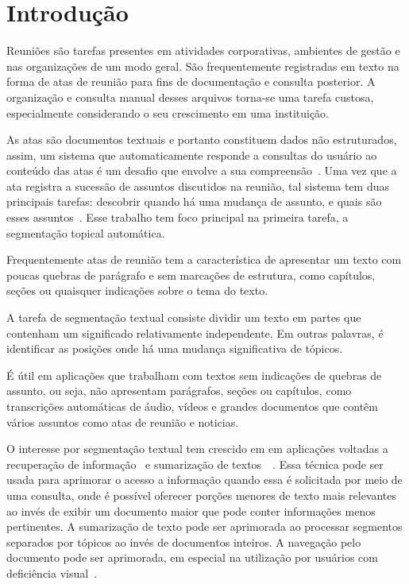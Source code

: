 

\section{Introdução}
	\label{sec:introducao}

Reuniões são tarefas presentes em atividades corporativas, ambientes de gestão e nas organizações de um modo geral. São frequentemente registradas em texto na forma de atas de reunião para fins de documentação e consulta posterior. A organização e consulta manual desses arquivos torna-se uma tarefa custosa, especialmente considerando o seu crescimento em uma instituição. 

As atas são documentos textuais e portanto constituem dados não estruturados, assim, um sistema que automaticamente responde a consultas do usuário ao conteúdo das atas é um desafio que envolve a sua compreensão~\cite{Bokaei2015}. 
Uma vez que a ata registra a sucessão de assuntos discutidos na reunião, tal sistema tem duas principais tarefas: descobrir quando há uma mudança de assunto, e quais são esses assuntos~\cite{Banerjee2006}. Esse trabalho tem foco principal na primeira tarefa, a segmentação topical automática.


Frequentemente atas de reunião tem a característica de apresentar um texto com poucas quebras de parágrafo e sem marcações de estrutura, como capítulos, seções ou quaisquer indicações sobre o tema do texto. 

A tarefa de segmentação textual consiste dividir um texto em partes que contenham um significado relativamente independente. Em outras palavras, é identificar as posições onde há uma mudança significativa de tópicos.

É útil em aplicações que trabalham com textos sem indicações de quebras de assunto, ou seja, não apresentam parágrafos, seções ou capítulos, como transcrições automáticas de áudio, vídeos e grandes documentos que contêm vários assuntos como atas de reunião e noticias.


O interesse por segmentação textual tem crescido em em aplicações voltadas a recuperação de informação~\cite{Reynar1999} %
e sumarização de textos~\cite{Boguraev2000}~\cite{Boguraev2000b}. %
Essa técnica pode ser usada para aprimorar o acesso a informação quando essa é solicitada por meio de uma consulta, onde é possível oferecer porções menores de texto mais relevantes ao invés de exibir um documento maior que pode conter informações menos pertinentes. 
A sumarização de texto pode ser aprimorada ao processar segmentos separados por tópicos ao invés de documentos inteiros. A navegação pelo documento pode ser aprimorada, em especial na utilização por usuários com deficiência visual~\cite{Choi2000}.



